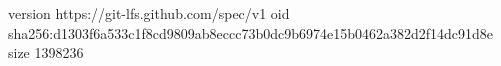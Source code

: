 version https://git-lfs.github.com/spec/v1
oid sha256:d1303f6a533c1f8cd9809ab8eccc73b0dc9b6974e15b0462a382d2f14dc91d8e
size 1398236
